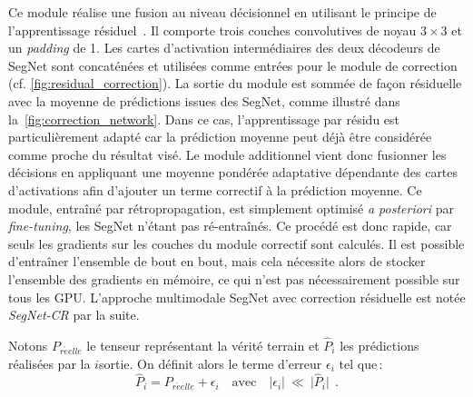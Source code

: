 Ce module réalise une fusion au niveau décisionnel en utilisant le principe de l'apprentissage résiduel~\cite{he_deep_2016}. Il comporte trois couches convolutives de noyau $3\times3$ et un \emph{padding} de \SI{1}{\px}. Les cartes d'activation intermédiaires des deux décodeurs de SegNet sont concaténées et utilisées comme entrées pour le module de correction (cf. \cref{fig:residual_correction}). La sortie du module est sommée de façon résiduelle avec la moyenne de prédictions issues des SegNet, comme illustré dans la~\cref{fig:correction_network}. Dans ce cas, l'apprentissage par résidu est particulièrement adapté car la prédiction moyenne peut déjà être considérée comme proche du résultat visé. Le module additionnel vient donc fusionner les décisions en appliquant une moyenne pondérée adaptative dépendante des cartes d'activations afin d'ajouter un terme correctif à la prédiction moyenne. Ce module, entraîné par rétropropagation, est simplement optimisé \emph{a posteriori} par \emph{fine-tuning}, les SegNet n'étant pas ré-entraînés. Ce procédé est donc rapide, car seuls les gradients sur les couches du module correctif sont calculés. Il est possible d'entraîner l'ensemble de bout en bout, mais cela nécessite alors de stocker l'ensemble des gradients en mémoire, ce qui n'est pas nécessairement possible sur tous les \gls{GPU}. L'approche multimodale SegNet avec correction résiduelle est notée \emph{SegNet-CR} par la suite.



Notons $P_\mathit{r\acute{e}elle}$ le tenseur représentant la vérité terrain et $\hat{P}_i$ les prédictions réalisées par la $i$\ieme sortie. On définit alors le terme d'erreur $\epsilon_i$ tel que\,:
\begin{equation}
\hat{P}_i = P_\mathit{r\acute{e}elle} + \epsilon_i \text{~~~avec~~~} \lvert \epsilon_i \lvert ~\ll~ \rvert \hat{P}_i \rvert~~.
\end{equation}

